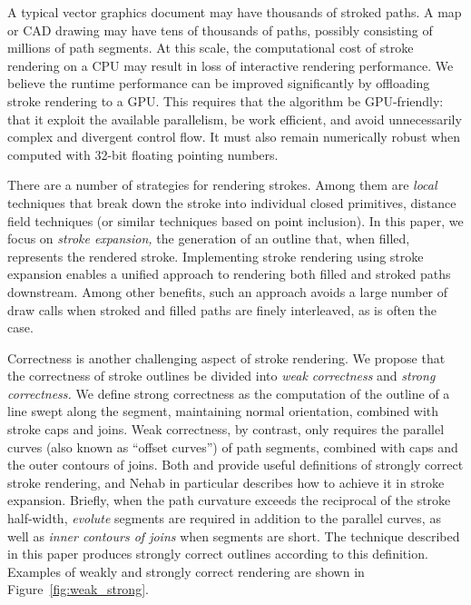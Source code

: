 \documentclass[sigconf, nonacm]{acmart}
\begin{document}
A typical vector graphics document may have thousands of stroked paths. A map or CAD drawing may have tens of thousands of paths, possibly consisting of millions of path segments. At this scale, the computational cost of stroke rendering on a CPU may result in loss of interactive rendering performance. We believe the runtime performance can be improved significantly by offloading stroke rendering to a GPU. This requires that the algorithm be GPU-friendly: that it exploit the available parallelism, be work efficient, and avoid unnecessarily complex and divergent control flow. It must also remain numerically robust when computed with 32-bit floating pointing numbers.

There are a number of strategies for rendering strokes. Among them are \emph{local} techniques that break down the stroke into individual closed primitives, distance field techniques (or similar techniques based on point inclusion). In this paper, we focus on \emph{stroke expansion,} the generation of an outline that, when filled, represents the rendered stroke. Implementing stroke rendering using stroke expansion enables a unified approach to rendering both filled and stroked paths downstream. Among other benefits, such an approach avoids a large number of draw calls when stroked and filled paths are finely interleaved, as is often the case.

Correctness is another challenging aspect of stroke rendering. We propose that the correctness of stroke outlines be divided into \emph{weak correctness} and \emph{strong correctness.} We define strong correctness as the computation of the outline of a line swept along the segment, maintaining normal orientation, combined with stroke caps and joins. Weak correctness, by contrast, only requires the parallel curves (also known as ``offset curves'') of path segments, combined with caps and the outer contours of joins. Both \citet{Nehab2020} and \citet{Kilgard2020} provide useful definitions of strongly correct stroke rendering, and Nehab in particular describes how to achieve it in stroke expansion. Briefly, when the path curvature exceeds the reciprocal of the stroke half-width, \emph{evolute} segments are required in addition to the parallel curves, as well as \emph{inner contours of joins} when segments are short. The technique described in this paper produces strongly correct outlines according to this definition. Examples of weakly and strongly correct rendering are shown in Figure~\ref{fig:weak_strong}.
\end{document}

